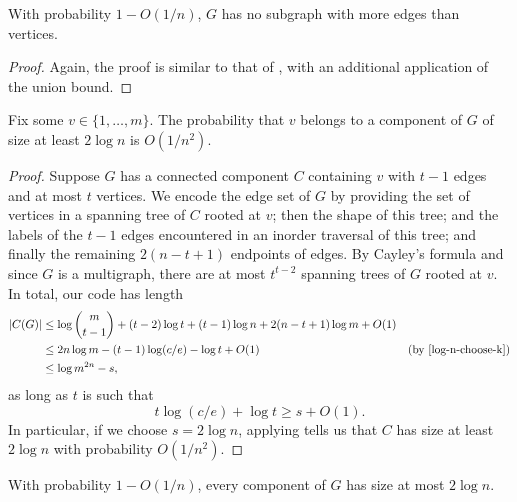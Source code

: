 \documentclass{patmorin}
\begin{document}
\begin{lem}
  With probability $1 - O(1/n)$, $G$ has no subgraph with more edges
  than vertices.
\end{lem}
\begin{proof}
  Again, the proof is similar to that of , with
  an additional application of the union bound.
\end{proof}

\begin{lem}
  Fix some $v \in \{1, \ldots, m\}$. The probability that $v$ belongs
  to a component of $G$ of size at least $2 \log n$ is $O(1/n^2)$.
\end{lem}
\begin{proof}
  Suppose $G$ has a connected component $C$ containing $v$ with
  $t - 1$ edges and at most $t$ vertices. We encode the edge set of
  $G$ by providing the set of vertices in a spanning tree of $C$
  rooted at $v$; then the shape of this tree; and the labels of the
  $t - 1$ edges encountered in an inorder traversal of this tree; and
  finally the remaining $2(n - t + 1)$ endpoints of edges. By Cayley's
  formula and since $G$ is a multigraph, there are at most $t^{t - 2}$
  spanning trees of $G$ rooted at $v$. In total, our code has length
  \begin{align*}
    |C(G)| &\leq \log \binom{m}{t - 1} + (t - 2) \log t + (t - 1) \log n + 2 (n - t + 1) \log m + O(1) \\
           &\leq 2n \log m - (t - 1) \log (c/e) - \log t + O(1) & \text{(by \eqref{log-n-choose-k})} \\
           &\leq \log m^{2n} - s,
  \end{align*}
  as long as $t$ is such that
  \[t \log (c/e) + \log t \geq s + O(1).\]
  In particular, if we choose $s = 2 \log n$, applying 
  tells us that $C$ has size at least $2 \log n$ with probability
  $O(1/n^2)$.
\end{proof}

\begin{cor}
  With probability $1 - O(1/n)$, every component of $G$ has size at
  most $2 \log n$.
\end{cor}
\end{document}
